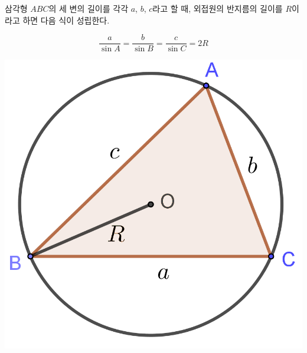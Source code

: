 \documentclass{oblivoir}
\begin{document}
\bigskip\bigskip
삼각형 \(ABC\)의 세 변의 길이를 각각 \(a\), \(b\), \(c\)라고 할 때, 외접원의 반지름의 길이를 \(R\)이라고 하면 다음 식이 성립한다.
\begin{mdframed}
%
\label{sin2}
\begin{minipage}[c]{.6\textwidth}
\[\frac a{\sin A}=\frac b{\sin B}=\frac c{\sin C}=2R\]
\end{minipage}
\begin{minipage}{.3\textwidth}
\begin{center}
\includegraphics[width=\textwidth]{sin_2}
\end{center}
\end{minipage}
\end{mdframed}
\end{document}
